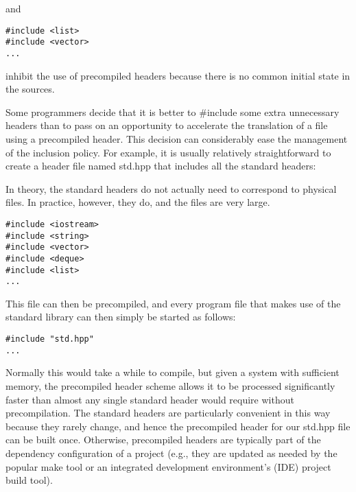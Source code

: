 and

\begin{lstlisting}[style=styleCXX]
#include <list>
#include <vector>
...
\end{lstlisting}

\noindent
inhibit the use of precompiled headers because there is no common initial state in the sources.

Some programmers decide that it is better to \#include some extra unnecessary headers than to pass on an opportunity to accelerate the translation of a file using a precompiled header. This decision can considerably ease the management of the inclusion policy. For example, it is usually relatively straightforward to create a header file named std.hpp that includes all the standard headers:

\begin{tcolorbox}[colback=webgreen!5!white,colframe=webgreen!75!black]
\hspace*{0.75cm}In theory, the standard headers do not actually need to correspond to physical files. In practice, however, they do, and the files are very large.
\end{tcolorbox}

\begin{lstlisting}[style=styleCXX]
#include <iostream>
#include <string>
#include <vector>
#include <deque>
#include <list>
...
\end{lstlisting}

This file can then be precompiled, and every program file that makes use of the standard library can then simply be started as follows:

\begin{lstlisting}[style=styleCXX]
#include "std.hpp"
...
\end{lstlisting}

Normally this would take a while to compile, but given a system with sufficient memory, the precompiled header scheme allows it to be processed significantly faster than almost any single standard header would require without precompilation. The standard headers are particularly convenient in this way because they rarely change, and hence the precompiled header for our std.hpp file can be built once. Otherwise, precompiled headers are typically part of the dependency configuration of a project (e.g., they are updated as needed by the popular make tool or an integrated development environment’s (IDE) project build tool).

